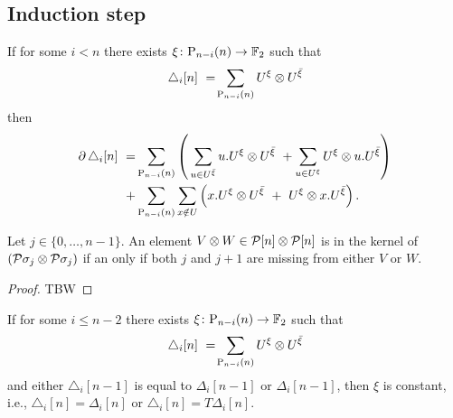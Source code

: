 \subsection{Induction step}

\begin{lemma} \label{l:boundary triangle}
	If for some $i < n$ there exists $\xi \colon \mathrm{P}_{n-i}(n) \to {\mathbb{F}_2}$ such that
	\[
	\triangle_i [n]\ =\! \sum_{\mathrm{P}_{n-i}(n)} {U^{\xi}} \otimes {U^{{\bar{\xi}}}}
	\]
	then
	\begin{align*}
	\label{equation: boundary of triangle}
	\bd \triangle_i [n]\ = &
	\sum_{\P_{n-i}(n)} \left( \, \sum_{u \in U^\barxi} u.U^\xi \ot U^\barxi \ +
	\sum_{u \in U^\xi} U^\xi \ot u.U^\barxi \right) \\ + &
	\sum_{\P_{n-i}(n)} \sum_{x \notin U} \left( x.U^\xi \ot U^\barxi \ +\ U^\xi \ot {x.U^\barxi} \right).
	\end{align*}
\end{lemma}

\begin{lemma} \label{l:condition to be in the kernel of sxs}
	Let $j \in \{0, \dots, n-1\}$.
	An element $V \otimes W \in \mathcal{P}[n] \otimes \mathcal{P}[n]$ is in the kernel of $(\mathcal{P} \sigma_j \otimes \mathcal{P} \sigma_j)$ if an only if both $j$ and $j+1$ are missing from either $V$ or $W$.
\end{lemma}

\begin{proof}
	TBW
\end{proof}

\begin{lemma}
	If for some $i \leq n-2$ there exists $\xi \colon \mathrm{P}_{n-i}(n) \to {\mathbb{F}_2}$ such that
	\[
	\triangle_i [n]\ =\! \sum_{\mathrm{P}_{n-i}(n)} {U^{\xi}} \otimes {U^{{\bar{\xi}}}}
	\]
	and either $\triangle_i [n-1]$ is equal to $\Delta_i [n-1]$ or $\Delta_i [n-1]$, then $\xi$ is constant, i.e., $\triangle_i [n] = \Delta_i [n]$ or $\triangle_i [n] = T \Delta_i [n]$.
\end{lemma}

